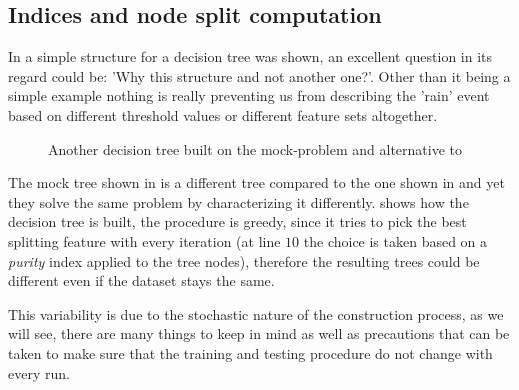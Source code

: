\subsection{Indices and node split computation}
In  a simple structure for a decision tree was shown, an excellent question in
its regard could be: 'Why this structure and not another one?'. Other than it being a simple example
nothing is really preventing us from describing the 'rain' event based on different threshold values
or different feature sets altogether.
\begin{figure}
	\centering
	\caption{Another decision tree built on the mock-problem and alternative to
		}
	\label{fig:simple-dt-alt}
\end{figure}
The mock tree shown in  is a different tree compared to the one shown in
 and yet they solve the same problem by characterizing it differently.
 shows how the decision tree is built, the procedure is greedy, since it
tries to pick the best splitting feature with every iteration (at line $10$ the choice is taken
based on a \emph{purity} index applied to the tree nodes), therefore the resulting
trees could be different even if the dataset stays the same.

This variability is due to the stochastic nature of the construction process, as we will see, there
are many things to keep in mind as well as precautions that can be taken to make sure that the
training and testing procedure do not change with every run.

